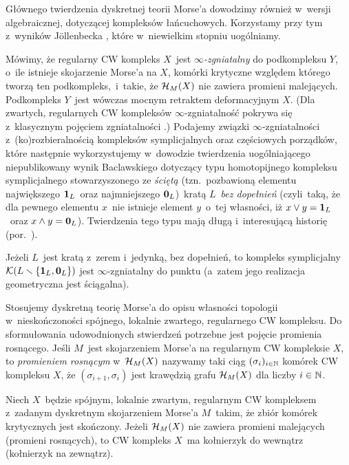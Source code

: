 Głównego twierdzenia dyskretnej teorii Morse'a dowodzimy również w~wersji algebraicznej, dotyczącej kompleksów łańcuchowych. Korzystamy przy tym z~wyników J{\"o}llenbecka \cite{Jollenbeck05}, które w~niewielkim stopniu uogólniamy.

Mówimy, że regularny CW kompleks $X$~jest \textit{$\infty$-zgniatalny} do podkompleksu $Y$, o~ile istnieje skojarzenie Morse'a na $X$, komórki krytyczne względem którego tworzą ten podkompleks,~i~takie, że $\mathcal{H}_M(X)$ nie zawiera promieni malejących. Podkompleks $Y$~jest wówczas mocnym retraktem deformacyjnym $X$. (Dla zwartych, regularnych CW kompleksów $\infty$-zgniatalność pokrywa się z~klasycznym pojęciem zgniatalności \cite{Cohen73}.) Podajemy związki $\infty$-zgniatalności z~(ko)rozbieralnością kompleksów symplicjalnych oraz częściowych porządków, które następnie wykorzystujemy w~dowodzie twierdzenia uogólniającego niepublikowany wynik Baclawskiego \cite{Baclawski} dotyczący typu homotopijnego kompleksu symplicjalnego stowarzyszonego ze \textit{ściętą} (tzn.~pozbawioną elementu największego $\mathbf{1}_L$~oraz najmniejszego $\mathbf{0}_L$)~kratą $L$~\textit{bez dopełnień} (czyli~taką, że dla pewnego elementu $x$~nie istnieje element $y$~o~tej własności, iż $x\lor y=\mathbf{1}_L$~oraz $x\land y=\mathbf{0}_L$). Twierdzenia tego typu mają długą i~interesującą historię (por.~\cite{Crapo66,Baclawski77,Baclawski81,Bjorner81,Bjorner83,Kozlov98,Baclawski12}).

\begin{tw*}[\ref{wn-baclawskiego-o-kratach-bez-dopelnien}]
Jeżeli $L$~jest kratą z~zerem i~jedynką, bez dopełnień, to kompleks symplicjalny $\mathcal{K}(L\smallsetminus\{\mathbf{1}_L,\mathbf{0}_L\})$ jest $\infty$-zgniatalny do punktu (a~zatem jego realizacja geometryczna jest ściągalna).
\end{tw*}

Stosujemy dyskretną teorię Morse'a do opisu własności topologii w~nieskończoności spójnego, lokalnie zwartego, regularnego CW kompleksu. Do sformułowania udowodnionych stwierdzeń potrzebne jest pojęcie promienia rosnącego. Jeśli $M$~jest skojarzeniem Morse'a na regularnym CW kompleksie $X$, to \textit{promieniem rosnącym} \cite{Ayala11} w~$\mathcal{H}_M(X)$ nazywamy taki ciąg $(\sigma_i)_{i\in\mathbb{N}}$ komórek CW kompleksu $X$, że $(\sigma_{i+1},\sigma_i)$ jest krawędzią grafu $\mathcal{H}_M(X)$ dla liczby $i\in\mathbb{N}$.

\begin{stw*}[\ref{stw-dyskretna-teoria-morsea-oswojone-do-wewnatrz}, \ref{stw-dyskretna-teoria-morsea-oswojone-na-zewnatrz}]
Niech $X$~będzie spójnym, lokalnie zwartym, regularnym CW kompleksem z~zadanym dyskretnym skojarzeniem Morse'a $M$~takim, że zbiór komórek krytycznych jest skończony. Jeżeli $\mathcal{H}_M(X)$ nie zawiera promieni malejących (promieni rosnących), to CW kompleks $X$~ma kołnierzyk do wewnątrz (kołnierzyk na zewnątrz).
\end{stw*}

